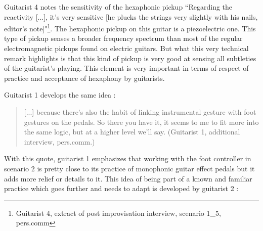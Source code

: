 \documentclass{article}
\begin{document}
Guitarist 4 notes the sensitivity of the hexaphonic pickup ``Regarding the reactivity [...], it's very sensitive [he plucks the strings very slightly with his nails, editor's note]"\footnote{Guitarist 4, extract of post improvisation interview,  scenario 1\_5, pers.comm}. The hexaphonic pickup on this guitar is a piezoelectric one. This type of pickup senses a broader frequency spectrum \cite{sci:Lemme_SoundSecret_electricGuitar} than most of the regular electromagnetic pickups found on electric guitars. 
But what this very technical remark highlights is that this kind of pickup is very good at sensing all subtleties of the guitarist's playing. This element is very important in terms of respect of practice and acceptance of hexaphony by guitarists. 


Guitarist 1 develops the same idea :


\begin{quote}
[...] because there's also the habit of linking instrumental gesture with foot gestures on the pedals. So there you have it, it seems to me to fit more into the same logic, but at a higher level we'll say. (Guitarist 1, additional interview, pers.comm.)
\end{quote}

With this quote, guitarist 1 emphasizes that working with the foot controller in scenario 2 is pretty close to its practice of monophonic guitar effect pedals but it adds more relief or details to it. This idea of being part of a known and familiar practice which goes further and needs to adapt is developed by guitarist 2 : 
\end{document}
